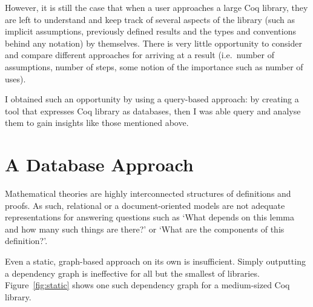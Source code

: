 However, it is still the case that when a user approaches a large Coq library, 
they are left to understand and keep track of several aspects of the
library (such as implicit assumptions, previously defined results and the
types and conventions behind any notation) by themselves. There is very little
opportunity to consider and compare different approaches for arriving at a
result (i.e.\ number of assumptions, number of steps, some notion of the
importance such as number of uses).

I obtained such an opportunity by using a query-based approach: by creating a
tool that expresses Coq library as databases, then I was able query and analyse
them to gain insights like those mentioned above.

\section{A Database Approach}

Mathematical theories are highly interconnected structures of definitions and
proofs. As such, relational or a document-oriented models are not adequate
representations for answering questions such as `What depends on this lemma
and how many such things are there?' or `What are the components of this
definition?'.

Even a static, graph-based approach on its own is insufficient. Simply
outputting a dependency graph is ineffective for all but the smallest of
libraries. Figure~\ref{fig:static} shows one such dependency graph for a
medium-sized Coq library.

